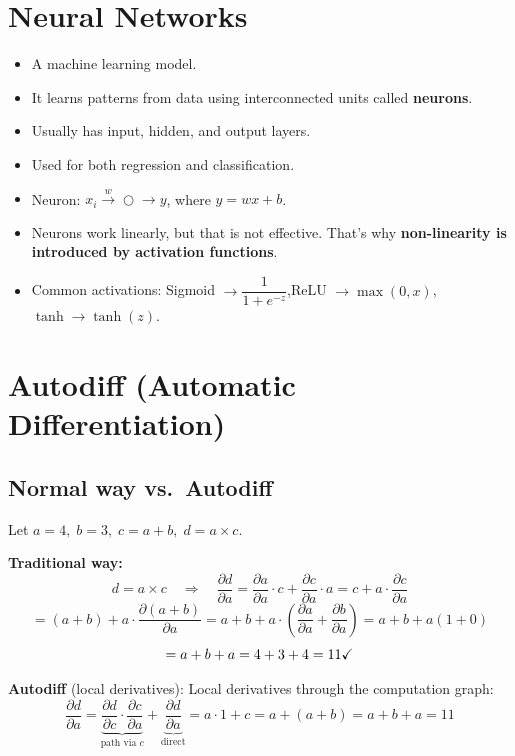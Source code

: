 \documentclass[12pt,a4paper]{article}
\begin{document}
\section{Neural Networks}

\begin{definitionbox}
\begin{itemize}
  \item A machine learning model.
  \item It learns patterns from data using interconnected units called \textbf{neurons}.
  \item Usually has input, hidden, and output layers.
  \item Used for both regression and classification.
  \item Neuron: $x_i \xrightarrow{w} \bigcirc \xrightarrow{} y$, where $y = wx + b$.
  \item Neurons work linearly, but that is not effective. That's why \textbf{non-linearity is introduced by activation functions}.
  \item Common activations: Sigmoid $\to \dfrac{1}{1+e^{-z}}$,\quad ReLU $\to \max(0,x)$,\quad $\tanh \to \tanh(z)$.
\end{itemize}
\end{definitionbox}

\section{Autodiff (Automatic Differentiation)}

\subsection{Normal way vs.\ Autodiff}

Let $a=4,\; b=3,\; c=a+b,\; d=a \times c$.

\textbf{Traditional way:}
\[
d = a \times c \quad \Rightarrow \quad \frac{\partial d}{\partial a} = \frac{\partial a}{\partial a}\cdot c + \frac{\partial c}{\partial a}\cdot a = c + a \cdot \frac{\partial c}{\partial a}
\]
\[
= (a+b) + a \cdot \frac{\partial(a+b)}{\partial a} = a+b + a\cdot\left(\frac{\partial a}{\partial a} + \frac{\partial b}{\partial a}\right) = a+b+a(1+0)
\]
\[
= a + b + a = 4+3+4 = 11 \text{\checkmark}
\]

\textbf{Autodiff} (local derivatives):
Local derivatives through the computation graph:
\[
\frac{\partial d}{\partial a} = \underbrace{\frac{\partial d}{\partial c}\cdot\frac{\partial c}{\partial a}}_{\text{path via }c} + \underbrace{\frac{\partial d}{\partial a}}_{\text{direct}}
= a \cdot 1 + c = a + (a+b) = a + b + a = 11
\]
\end{document}
